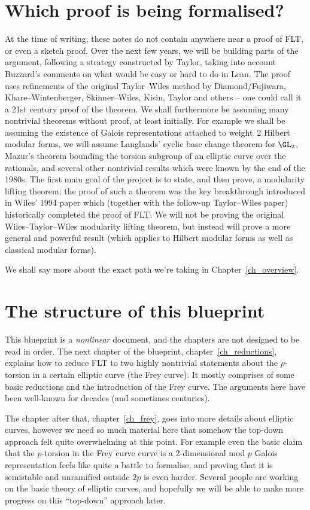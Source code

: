 \section{Which proof is being formalised?}

At the time of writing, these notes do not contain anywhere near a proof of FLT, or even a sketch proof.
Over the next few years, we will be building parts of the argument, following a strategy
constructed by Taylor, taking into account Buzzard's comments on what would be easy or hard to do
in Lean. The proof uses refinements of the original Taylor--Wiles method by Diamond/Fujiwara,
Khare--Wintenberger, Skinner--Wiles, Kisin, Taylor and others -- one could call it a 21st century
proof of the theorem. We shall furthermore be assuming many nontrivial theorems without proof,
at least initially. For example we shall be assuming the existence of Galois representations
attached to weight~2 Hilbert modular forms, we will assume Langlands' cyclic base change theorem for $\GL_2$,
Mazur's theorem bounding the torsion subgroup of an elliptic curve over the rationals, and
several other nontrivial results which were known by the end of the 1980s. The first main goal
of the project is to state, and then prove, a modularity lifting theorem; the proof of such a theorem
was the key breakthrough introduced in Wiles' 1994 paper which (together with the follow-up Taylor--Wiles paper)
historically completed the proof
of FLT. We will not be proving the original Wiles--Taylor--Wiles modularity lifting theorem, but
instead will prove a more general and powerful result (which applies to Hilbert modular forms
as well as classical modular forms).

We shall say more about the exact path we're taking in
Chapter~\ref{ch_overview}.

\section{The structure of this blueprint}

This blueprint is a \emph{nonlinear} document, and the chapters are not designed to be read
in order. The next chapter of the blueprint, chapter~\ref{ch_reductions}, explains how to reduce FLT
to two highly nontrivial statements about the $p$-torsion in a certain elliptic curve (the Frey curve).
It mostly comprises of some basic reductions and the introduction of the Frey curve. The arguments
here have been well-known for decades (and sometimes centuries).

The chapter after that, chapter~\ref{ch_frey}, goes into more details about elliptic curves,
however we need so much material here that somehow the top-down approach felt quite overwhelming
at this point. For example even the basic claim that the $p$-torsion in the Frey curve curve is
a 2-dimensional mod $p$ Galois representation feels like quite a battle to formalise,
and proving that it is semistable and unramified outside $2p$ is even harder.
Several people are working on the basic theory of elliptic curves, and hopefully
we will be able to make more progress on this ``top-down'' approach later.

